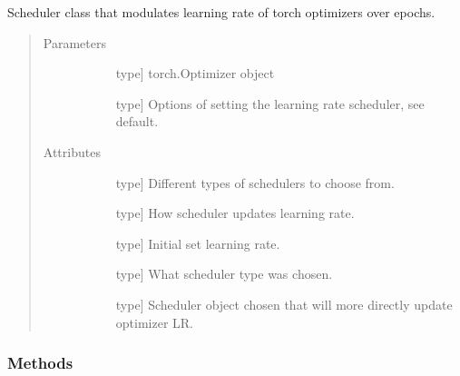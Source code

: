 \documentclass[letterpaper,10pt,english]{sphinxmanual}
\begin{document}
\begin{fulllineitems}
\label{\detokenize{index:methylnet.schedulers.Scheduler}}
Scheduler class that modulates learning rate of torch optimizers over epochs.
\begin{quote}\begin{description}
\item[{Parameters}] \leavevmode\begin{description}
\item[{}] \leavevmode{[}type{]}
torch.Optimizer object

\item[{}] \leavevmode{[}type{]}
Options of setting the learning rate scheduler, see default.

\end{description}

\item[{Attributes}] \leavevmode\begin{description}
\item[{}] \leavevmode{[}type{]}
Different types of schedulers to choose from.

\item[{}] \leavevmode{[}type{]}
How scheduler updates learning rate.

\item[{}] \leavevmode{[}type{]}
Initial set learning rate.

\item[{}] \leavevmode{[}type{]}
What scheduler type was chosen.

\item[{}] \leavevmode{[}type{]}
Scheduler object chosen that will more directly update optimizer LR.

\end{description}

\end{description}\end{quote}
\subsubsection*{Methods}



\end{fulllineitems}
\end{document}
